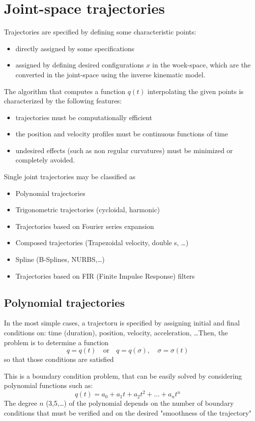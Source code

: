 \documentclass{book}
\begin{document}
\section{Joint-space trajectories}
Trajectories are specified by defining some characteristic points:
\begin{itemize}
    \item directly assigned by some specifications
    \item assigned by defining desired configurations $x$ in the woek-space, which are the converted in the joint-space using the inverse kinematic model.
\end{itemize}
The algorithm that computes a function $q(t)$ interpolating the given points is characterized by the following features:
\begin{itemize}
    \item trajectories must be computationally efficient 
    \item the position and velocity profiles must be continuous functions of time 
    \item undesired effects (such as non regular curvatures) must be minimized or completely avoided. 
\end{itemize}
Single joint trajectories may be classified as 
\begin{itemize}
    \item Polynomial trajectories 
    \item Trigonometric trajectories (cycloidal, harmonic)
    \item Trajectories based on Fourier series expansion 
    \item Composed trajectories (Trapezoidal velocity, double s, \dots)
    \item Spline (B-Splines, NURBS,\dots)
    \item Trajectories based on FIR (Finite Impulse Response) filters
\end{itemize}

\subsection{Polynomial trajectories}
In the most simple cases, a trajectoru is specified by assigning initial and final conditions on: time (duration), position, velocity, acceleration, \dots Then, the problem is to determine a function 
\[
    q=q(t) \quad \text{or} \quad q=q(\sigma), \quad \sigma=\sigma(t)
\]
so that those conditions are satisfied 

This is a boundary condition problem, that can be easily solved by considering polynomial functions such as: 
\[
    q(t)=a_0+a_1t+a_2t^2+\dots+a_nt^n
\]
The degree $n$ (3,5,\dots) of the polynomial depends on the number of boundary conditions that must be verified and on the desired "smoothness of the trajectory"
\end{document}
